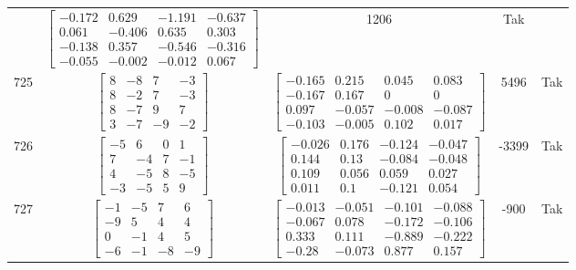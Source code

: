 \documentclass[a4paper,12pt]{article}
\begin{document}
\begin{tabular}{c c c c c}
&
$\begin{bmatrix} -0.172 & 0.629 & -1.191 & -0.637 \\ 0.061 & -0.406 & 0.635 & 0.303 \\ -0.138 & 0.357 & -0.546 & -0.316 \\ -0.055 & -0.002 & -0.012 & 0.067 \end{bmatrix}$
&
1206
&
Tak
\\
725
&
$\begin{bmatrix} 8 & -8 & 7 & -3 \\ 8 & -2 & 7 & -3 \\ 8 & -7 & 9 & 7 \\ 3 & -7 & -9 & -2 \end{bmatrix}$
&
$\begin{bmatrix} -0.165 & 0.215 & 0.045 & 0.083 \\ -0.167 & 0.167 & 0 & 0 \\ 0.097 & -0.057 & -0.008 & -0.087 \\ -0.103 & -0.005 & 0.102 & 0.017 \end{bmatrix}$
&
5496
&
Tak
\\
726
&
$\begin{bmatrix} -5 & 6 & 0 & 1 \\ 7 & -4 & 7 & -1 \\ 4 & -5 & 8 & -5 \\ -3 & -5 & 5 & 9 \end{bmatrix}$
&
$\begin{bmatrix} -0.026 & 0.176 & -0.124 & -0.047 \\ 0.144 & 0.13 & -0.084 & -0.048 \\ 0.109 & 0.056 & 0.059 & 0.027 \\ 0.011 & 0.1 & -0.121 & 0.054 \end{bmatrix}$
&
-3399
&
Tak
\\
727
&
$\begin{bmatrix} -1 & -5 & 7 & 6 \\ -9 & 5 & 4 & 4 \\ 0 & -1 & 4 & 5 \\ -6 & -1 & -8 & -9 \end{bmatrix}$
&
$\begin{bmatrix} -0.013 & -0.051 & -0.101 & -0.088 \\ -0.067 & 0.078 & -0.172 & -0.106 \\ 0.333 & 0.111 & -0.889 & -0.222 \\ -0.28 & -0.073 & 0.877 & 0.157 \end{bmatrix}$
&
-900
&
Tak
\\

\end{tabular}
\end{document}
